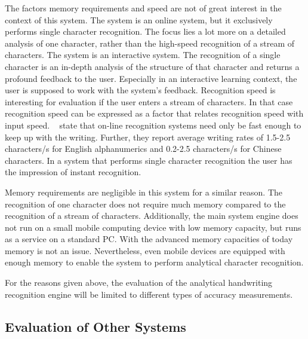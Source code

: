 The factors memory requirements and speed are not of great interest in
the context of this system. The system is an online system, but it
exclusively performs single character recognition. The focus lies a lot more on
a detailed analysis of one character, rather than the high-speed recognition
of a stream of characters. The system is an interactive system. 
The recognition of a single character is an in-depth analysis of the
structure of that character and returns a profound feedback to the user.
Especially in an interactive learning context, the user is supposed to
work with the system's feedback. Recognition speed is interesting for evaluation
if the user enters a stream of characters. In that case recognition speed
can be expressed as a factor that relates recognition speed with input speed.
~\citeyear{Tappert1990} state that on-line
recognition systems need only be fast enough to keep up with the writing. 
Further, they report average writing rates of  1.5-2.5  characters/s  for 
English  alphanumerics  and 0.2-2.5  characters/s  for  Chinese  characters.  
In a system that performs single character recognition the user has the 
impression of instant recognition.

Memory requirements are negligible in this system for a similar reason.
The recognition of one character does not require much memory compared to
the recognition of a stream of characters. Additionally, the main system engine
does not run on a small mobile computing device with low memory capacity,
but runs as a service on a standard PC. With the advanced memory capacities
of today memory is not an issue. Nevertheless, even mobile devices are 
equipped with enough memory to enable the system to perform analytical character
recognition.

For the reasons given above, the evaluation of the analytical handwriting 
recognition engine will be limited to different types of accuracy measurements.


\subsection{Evaluation of Other Systems}
\label{sec:eval:othersystems}

